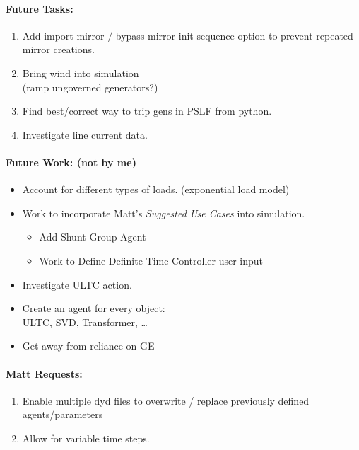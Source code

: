 \documentclass[12pt]{article}
\begin{document}
\begin{multicols}{2}
\begin{enumerate}
\vfill\null
\columnbreak

\paragraph{Future Tasks:} %
	\begin{enumerate}
		
		\item Add import mirror / bypass mirror init sequence option to prevent repeated mirror creations.

		\item Bring wind into simulation \\ (ramp ungoverned generators?)

		\item Find best/correct way to trip gens in PSLF from python.

		\item Investigate line current data.
		
	\end{enumerate}
\paragraph{Future Work: (not by me)}
\begin{itemize}
\item Account for different types of loads. (exponential load model) %
\item Work to incorporate Matt's \emph{Suggested Use Cases} into simulation.
		\begin{itemize}
		\item Add Shunt Group Agent
		\item Work to Define Definite Time Controller user input
		\end{itemize} 


		\item Investigate ULTC action.

		\item Create an agent for every object: \\ ULTC, SVD, Transformer, \ldots

		\item Get away from reliance on GE
		
\end{itemize}

\paragraph{Matt Requests:}
\begin{enumerate}
		\item Enable multiple dyd files to overwrite / replace previously defined agents/parameters
		\item Allow for variable time steps.
\end{enumerate}

	\end{enumerate}



\vfill\null

\end{multicols}
\pagebreak
\end{document}

